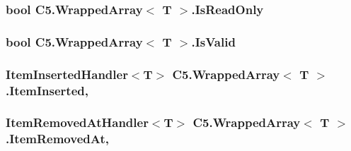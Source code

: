 \hypertarget{class_c5_1_1_wrapped_array_ac494d49951b3285021ae35adfaa0da22}{}
\subsubsection[{Is\+Read\+Only}]{\setlength{\rightskip}{0pt plus 5cm}bool {\bf C5.\+Wrapped\+Array}$<$ T $>$.Is\+Read\+Only\hspace{0.3cm}{\ttfamily [get]}}\label{class_c5_1_1_wrapped_array_ac494d49951b3285021ae35adfaa0da22}




\hypertarget{class_c5_1_1_wrapped_array_a3ed2a1a22a1ade67fa7b8a55ab91ef47}{}
\subsubsection[{Is\+Valid}]{\setlength{\rightskip}{0pt plus 5cm}bool {\bf C5.\+Wrapped\+Array}$<$ T $>$.Is\+Valid\hspace{0.3cm}{\ttfamily [get]}}\label{class_c5_1_1_wrapped_array_a3ed2a1a22a1ade67fa7b8a55ab91ef47}




\hypertarget{class_c5_1_1_wrapped_array_a2a153b5a67a39f2d05e987e447bd9352}{}
\subsubsection[{Item\+Inserted}]{\setlength{\rightskip}{0pt plus 5cm}Item\+Inserted\+Handler$<$T$>$ {\bf C5.\+Wrapped\+Array}$<$ T $>$.Item\+Inserted\hspace{0.3cm}{\ttfamily [add]}, {\ttfamily [remove]}}\label{class_c5_1_1_wrapped_array_a2a153b5a67a39f2d05e987e447bd9352}




\hypertarget{class_c5_1_1_wrapped_array_a76779191e9851ed03c5313157bb41a62}{}
\subsubsection[{Item\+Removed\+At}]{\setlength{\rightskip}{0pt plus 5cm}Item\+Removed\+At\+Handler$<$T$>$ {\bf C5.\+Wrapped\+Array}$<$ T $>$.Item\+Removed\+At\hspace{0.3cm}{\ttfamily [add]}, {\ttfamily [remove]}}\label{class_c5_1_1_wrapped_array_a76779191e9851ed03c5313157bb41a62}




